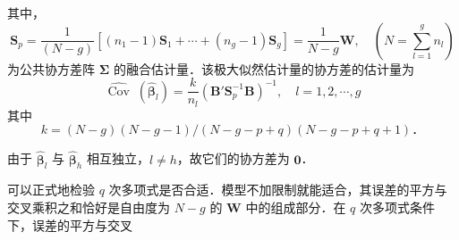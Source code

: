 其中，
\[
\mathbf{S}_p=\frac{1}{(N-g)}\left[(n_1-1)\mathbf{S}_1+\cdots+(n_g-1)\mathbf{S}_g\right]=\frac{1}{N-g}\mathbf{W},\quad \left(N=\sum_{l=1}^{g}n_l\right)
\]
为公共协方差阵 $\boldsymbol{\Sigma}$ 的融合估计量．该极大似然估计量的协方差的估计量为
\label{eq:6-79}
\begin{equation}
\widehat{\operatorname{Cov}}\;(\hat{\boldsymbol{\beta}}_l)=\frac{k}{n_l}(\mathbf{B}'\mathbf{S}_p^{-1}\mathbf{B})^{-1},\quad l=1,2,\cdots,g \tag{6-79}
\end{equation}
其中
\[
k=(N-g)(N-g-1)/(N-g-p+q)(N-g-p+q+1)\text{．}
\]

由于 $\hat{\boldsymbol{\beta}}_l$ 与 $\hat{\boldsymbol{\beta}}_h$ 相互独立，$l\neq h$，故它们的协方差为 $\mathbf{0}$．

可以正式地检验 $q$ 次多项式是否合适．模型不加限制就能适合，其误差的平方与交叉乘积之和恰好是自由度为 $N-g$ 的 $\mathbf{W}$ 中的组成部分．在 $q$ 次多项式条件下，误差的平方与交叉
